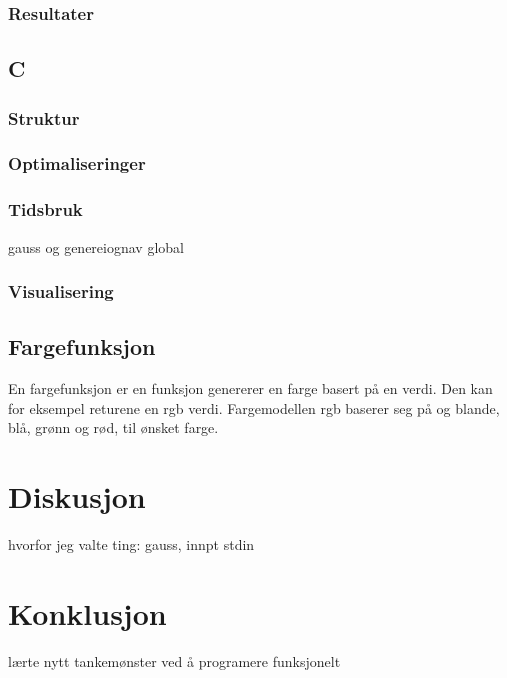 \documentclass[10pt,a4paper, norsk]{article}
\begin{document}
\subsubsection{Resultater}



\subsection{C}

\subsubsection{Struktur}
\subsubsection{Optimaliseringer}
\subsubsection{Tidsbruk}

gauss og genereiognav global
\subsubsection{Visualisering}




\subsection{Fargefunksjon}
En fargefunksjon er en funksjon genererer en farge basert på en verdi. Den kan for eksempel returene en rgb verdi. Fargemodellen rgb baserer seg på og blande, blå, grønn og rød, til ønsket farge. 


\section{Diskusjon}

hvorfor jeg valte ting: gauss, innpt stdin

\section{Konklusjon}

lærte nytt tankemønster ved å programere funksjonelt

\paragraph{} 
\end{document}
